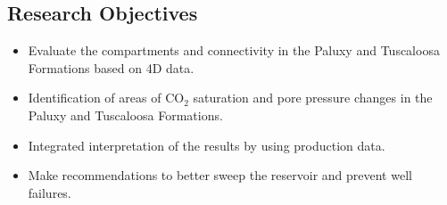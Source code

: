 \subsection{Research Objectives}

\begin{itemize}
\item Evaluate the compartments and connectivity in the Paluxy and Tuscaloosa 
      Formations based on 4D data.  
\item Identification of areas of CO$_2$ saturation and pore pressure
      changes in the Paluxy and Tuscaloosa Formations. 
\item Integrated interpretation of the results by using production data. 
\item Make recommendations to better sweep the reservoir and prevent well failures.
\end{itemize}


\clearpage


   
   
